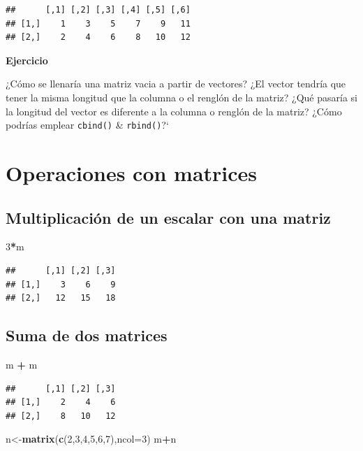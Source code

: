 \documentclass[
]{book}
\newenvironment{Shaded}{\begin{snugshade}}{\end{snugshade}}
\newcommand{\AttributeTok}[1]{\textcolor[rgb]{0.13,0.29,0.53}{#1}}
\newcommand{\DecValTok}[1]{\textcolor[rgb]{0.00,0.00,0.81}{#1}}
\newcommand{\FunctionTok}[1]{\textcolor[rgb]{0.13,0.29,0.53}{\textbf{#1}}}
\newcommand{\NormalTok}[1]{#1}
\newcommand{\OtherTok}[1]{\textcolor[rgb]{0.56,0.35,0.01}{#1}}
\newcommand{\SpecialCharTok}[1]{\textcolor[rgb]{0.81,0.36,0.00}{\textbf{#1}}}
\begin{document}
\begin{verbatim}
##      [,1] [,2] [,3] [,4] [,5] [,6]
## [1,]    1    3    5    7    9   11
## [2,]    2    4    6    8   10   12
\end{verbatim}

\textbf{Ejercicio}

¿Cómo se llenaría una matriz vacia a partir de vectores?
¿El vector tendría que tener la misma longitud que la columna o el renglón de la matriz?
¿Qué pasaría si la longitud del vector es diferente a la columna o renglón de la matriz?
¿Cómo podrías emplear \texttt{cbind()} \& \texttt{rbind()}?{}`

\section{Operaciones con matrices}\label{operaciones-con-matrices}

\subsection{Multiplicación de un escalar con una matriz}\label{multiplicaciuxf3n-de-un-escalar-con-una-matriz}

\begin{Shaded}
\begin{Highlighting}[]
\DecValTok{3}\SpecialCharTok{*}\NormalTok{m}
\end{Highlighting}
\end{Shaded}

\begin{verbatim}
##      [,1] [,2] [,3]
## [1,]    3    6    9
## [2,]   12   15   18
\end{verbatim}

\subsection{Suma de dos matrices}\label{suma-de-dos-matrices}

\begin{Shaded}
\begin{Highlighting}[]
\NormalTok{m }\SpecialCharTok{+}\NormalTok{ m}
\end{Highlighting}
\end{Shaded}

\begin{verbatim}
##      [,1] [,2] [,3]
## [1,]    2    4    6
## [2,]    8   10   12
\end{verbatim}

\begin{Shaded}
\begin{Highlighting}[]
\NormalTok{n}\OtherTok{\textless{}{-}}\FunctionTok{matrix}\NormalTok{(}\FunctionTok{c}\NormalTok{(}\DecValTok{2}\NormalTok{,}\DecValTok{3}\NormalTok{,}\DecValTok{4}\NormalTok{,}\DecValTok{5}\NormalTok{,}\DecValTok{6}\NormalTok{,}\DecValTok{7}\NormalTok{),}\AttributeTok{ncol=}\DecValTok{3}\NormalTok{)}
\NormalTok{m}\SpecialCharTok{+}\NormalTok{n}
\end{Highlighting}
\end{Shaded}
\end{document}
